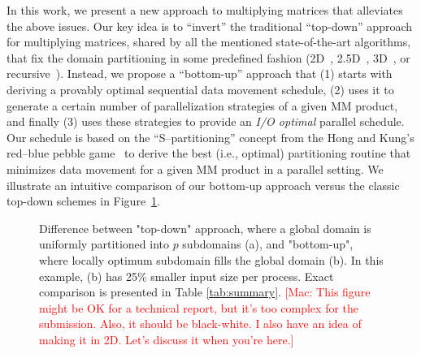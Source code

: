 \documentclass[sigplan,review,anonymous]{acmart}\settopmatter{printfolios=true,printccs=false,printacmref=false}
\newcommand\mac[1]{\textcolor{red}{[Mac: #1]}}
\begin{document}
In this work, we present a new approach to multiplying matrices that alleviates
the above issues. Our key idea is to ``invert'' the traditional ``top-down''
approach for multiplying matrices, shared by all the mentioned state-of-the-art
algorithms, that fix the domain partitioning in some predefined fashion
(2D~\cite{d1}, 2.5D~\cite{d2}, 3D~\cite{d3}, or
recursive~\cite{d4}).
%
Instead, we propose a ``bottom-up'' approach that (1) starts with deriving a
provably optimal sequential data movement schedule, (2) uses it to generate a certain
number of parallelization strategies of a given MM product, and finally (3)
uses these strategies to provide an \emph{I/O optimal} parallel schedule.
%
Our schedule is based on the ``S--partitioning'' concept from the Hong and 
Kung's 
red--blue
pebble game~\cite{redblue} to derive the best (i.e., optimal) partitioning
routine that minimizes data movement for a given MM product in a parallel
setting.
%
We illustrate an intuitive comparison of our bottom-up approach versus the
classic top-down schemes in Figure~\ref{fig:topdown-vs-bottomup}.

\begin{figure}[!tbp]
\centering
%
%
\hfill
%
%
\caption{Difference between "top-down" approach, where a global domain is
uniformly partitioned into $p$ subdomains (a), and "bottom-up", where locally
optimum subdomain fills the global domain (b). In this example, (b) has 25\%
smaller input size per process. Exact comparison is presented in Table 
\ref{tab:summary}. \mac{This figure might be OK for a technical report,
but it's too complex for the submission. Also, it should be black-white.
I also have an idea of making it in 2D. Let's discuss it when you're here.}}
%
\label{fig:topdown-vs-bottomup}
\end{figure}
\end{document}
